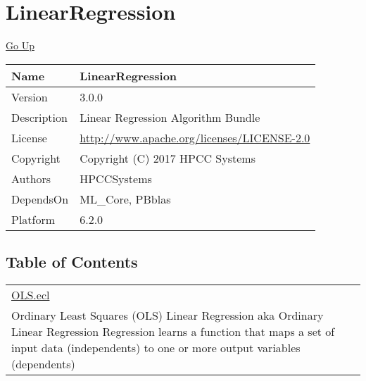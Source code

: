 \chapter*{\color{headtoc} LinearRegression}
\hypertarget{ecldoc:toc:root/LinearRegression}{}
\hyperlink{ecldoc:toc:}{Go Up}

\begin{tabularx}{\textwidth}{|l|X|}
\hline
Name &
LinearRegression
 \\
\hline
Version &
3.0.0
 \\
\hline
Description &
Linear Regression Algorithm Bundle
 \\
\hline
License &
\url{http://www.apache.org/licenses/LICENSE-2.0}
 \\
\hline
Copyright &
Copyright (C) 2017 HPCC Systems
 \\
\hline
Authors &
HPCCSystems
 \\
\hline
DependsOn &
ML\_Core, PBblas
 \\
\hline
Platform &
6.2.0
 \\
\hline
\end{tabularx}

\section*{Table of Contents}
{\renewcommand{\arraystretch}{1.5}
\begin{longtable}{|p{\textwidth}|}
\hline
\hyperlink{ecldoc:toc:LinearRegression.OLS}{OLS.ecl} \\
Ordinary Least Squares (OLS) Linear Regression aka Ordinary Linear Regression Regression learns a function that maps a set of input data (independents) to one or more output variables (dependents) \\
\hline
\end{longtable}
}


